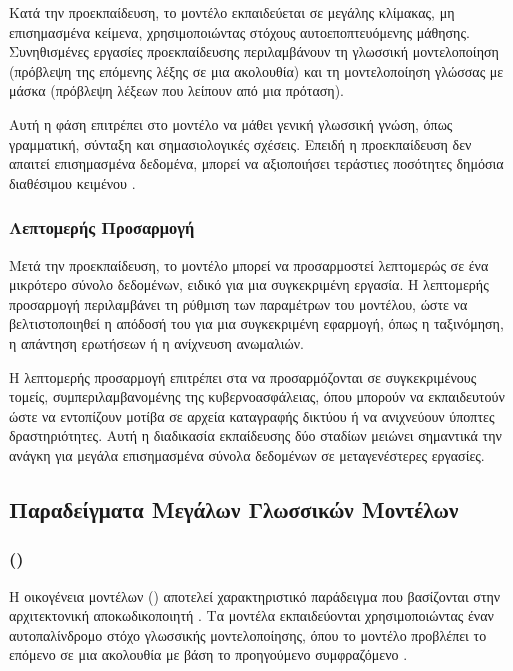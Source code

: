 Κατά την προεκπαίδευση, το μοντέλο εκπαιδεύεται σε μεγάλης κλίμακας, μη επισημασμένα κείμενα, χρησιμοποιώντας στόχους αυτοεποπτευόμενης μάθησης. Συνηθισμένες εργασίες προεκπαίδευσης περιλαμβάνουν τη γλωσσική μοντελοποίηση (πρόβλεψη της επόμενης λέξης σε μια ακολουθία) και τη μοντελοποίηση γλώσσας με μάσκα (πρόβλεψη λέξεων που λείπουν από μια πρόταση).

Αυτή η φάση επιτρέπει στο μοντέλο να μάθει γενική γλωσσική γνώση, όπως γραμματική, σύνταξη και σημασιολογικές σχέσεις. Επειδή η προεκπαίδευση δεν απαιτεί επισημασμένα δεδομένα, μπορεί να αξιοποιήσει τεράστιες ποσότητες δημόσια διαθέσιμου κειμένου \cite{devlin2019bert}.

\subsubsection{Λεπτομερής Προσαρμογή}

Μετά την προεκπαίδευση, το μοντέλο μπορεί να προσαρμοστεί λεπτομερώς σε ένα μικρότερο σύνολο δεδομένων, ειδικό για μια συγκεκριμένη εργασία. Η λεπτομερής προσαρμογή περιλαμβάνει τη ρύθμιση των παραμέτρων του μοντέλου, ώστε να βελτιστοποιηθεί η απόδοσή του για μια συγκεκριμένη εφαρμογή, όπως η ταξινόμηση, η απάντηση ερωτήσεων ή η ανίχνευση ανωμαλιών.

Η λεπτομερής προσαρμογή επιτρέπει στα  να προσαρμόζονται σε συγκεκριμένους τομείς, συμπεριλαμβανομένης της κυβερνοασφάλειας, όπου μπορούν να εκπαιδευτούν ώστε να εντοπίζουν μοτίβα σε αρχεία καταγραφής δικτύου ή να ανιχνεύουν ύποπτες δραστηριότητες. Αυτή η διαδικασία εκπαίδευσης δύο σταδίων μειώνει σημαντικά την ανάγκη για μεγάλα επισημασμένα σύνολα δεδομένων σε μεταγενέστερες εργασίες.

\subsection{Παραδείγματα Μεγάλων Γλωσσικών Μοντέλων}

\subsubsection{ ()}

Η οικογένεια μοντέλων  () αποτελεί χαρακτηριστικό παράδειγμα  που βασίζονται στην αρχιτεκτονική αποκωδικοποιητή . Τα μοντέλα  εκπαιδεύονται χρησιμοποιώντας έναν αυτοπαλίνδρομο στόχο γλωσσικής μοντελοποίησης, όπου το μοντέλο προβλέπει το επόμενο  σε μια ακολουθία με βάση το προηγούμενο συμφραζόμενο \cite{brown2020language}.


